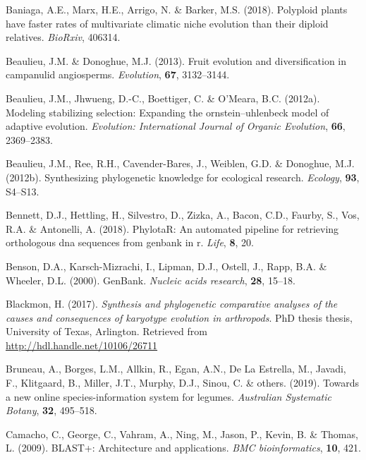 \documentclass[]{article}
\begin{document}
\leavevmode\hypertarget{ref-baniaga2018polyploid}{}%
Baniaga, A.E., Marx, H.E., Arrigo, N. \& Barker, M.S. (2018). Polyploid plants have faster rates of multivariate climatic niche evolution than their diploid relatives. \emph{BioRxiv}, 406314.

\leavevmode\hypertarget{ref-beaulieu2013fruit}{}%
Beaulieu, J.M. \& Donoghue, M.J. (2013). Fruit evolution and diversification in campanulid angiosperms. \emph{Evolution}, \textbf{67}, 3132--3144.

\leavevmode\hypertarget{ref-beaulieu2012modeling}{}%
Beaulieu, J.M., Jhwueng, D.-C., Boettiger, C. \& O'Meara, B.C. (2012a). Modeling stabilizing selection: Expanding the ornstein--uhlenbeck model of adaptive evolution. \emph{Evolution: International Journal of Organic Evolution}, \textbf{66}, 2369--2383.

\leavevmode\hypertarget{ref-beaulieu2012synthesizing}{}%
Beaulieu, J.M., Ree, R.H., Cavender-Bares, J., Weiblen, G.D. \& Donoghue, M.J. (2012b). Synthesizing phylogenetic knowledge for ecological research. \emph{Ecology}, \textbf{93}, S4--S13.

\leavevmode\hypertarget{ref-bennett2018phylotar}{}%
Bennett, D.J., Hettling, H., Silvestro, D., Zizka, A., Bacon, C.D., Faurby, S., Vos, R.A. \& Antonelli, A. (2018). PhylotaR: An automated pipeline for retrieving orthologous dna sequences from genbank in r. \emph{Life}, \textbf{8}, 20.

\leavevmode\hypertarget{ref-benson2000genbank}{}%
Benson, D.A., Karsch-Mizrachi, I., Lipman, D.J., Ostell, J., Rapp, B.A. \& Wheeler, D.L. (2000). GenBank. \emph{Nucleic acids research}, \textbf{28}, 15--18.

\leavevmode\hypertarget{ref-blackmon2017synthesis}{}%
Blackmon, H. (2017). \emph{Synthesis and phylogenetic comparative analyses of the causes and consequences of karyotype evolution in arthropods}. PhD thesis thesis, University of Texas, Arlington. Retrieved from \url{http://hdl.handle.net/10106/26711}

\leavevmode\hypertarget{ref-bruneau2019towards}{}%
Bruneau, A., Borges, L.M., Allkin, R., Egan, A.N., De La Estrella, M., Javadi, F., Klitgaard, B., Miller, J.T., Murphy, D.J., Sinou, C. \& others. (2019). Towards a new online species-information system for legumes. \emph{Australian Systematic Botany}, \textbf{32}, 495--518.

\leavevmode\hypertarget{ref-camacho2009blast}{}%
Camacho, C., George, C., Vahram, A., Ning, M., Jason, P., Kevin, B. \& Thomas, L. (2009). BLAST+: Architecture and applications. \emph{BMC bioinformatics}, \textbf{10}, 421.
\end{document}
